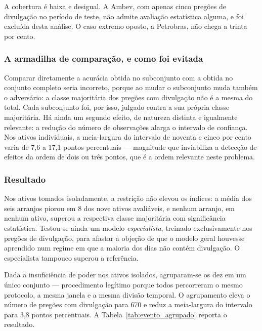 A cobertura é baixa e desigual. A Ambev, com apenas cinco pregões de divulgação no período de
teste, não admite avaliação estatística alguma, e foi excluída desta análise. O caso extremo
oposto, a Petrobras, não chega a trinta por cento.

\subsubsection{A armadilha de comparação, e como foi evitada}

Comparar diretamente a acurácia obtida no subconjunto com a obtida no conjunto completo seria
incorreto, porque ao mudar o subconjunto muda também o adversário: a classe majoritária dos
pregões com divulgação não é a mesma do total. Cada subconjunto foi, por isso, julgado contra a
sua própria classe majoritária. Há ainda um segundo efeito, de natureza distinta e igualmente
relevante: a redução do número de observações alarga o intervalo de confiança. Nos ativos
individuais, a meia-largura do intervalo de noventa e cinco por cento varia de 7{,}6 a 17{,}1
pontos percentuais --- magnitude que inviabiliza a detecção de efeitos da ordem de dois ou três
pontos, que é a ordem relevante neste problema.

\subsubsection{Resultado}

Nos ativos tomados isoladamente, a restrição não elevou os índices: a média dos seis arranjos
piorou em 8 dos nove ativos avaliáveis, e nenhum arranjo, em nenhum ativo, superou a
respectiva classe majoritária com significância estatística. Testou-se ainda um modelo
\emph{especialista}, treinado exclusivamente nos pregões de divulgação, para afastar a objeção de
que o modelo geral houvesse aprendido num regime em que a maioria dos dias não contém
divulgação. O especialista tampouco superou a referência.

Dada a insuficiência de poder nos ativos isolados, agruparam-se os dez em um único conjunto ---
procedimento legítimo porque todos percorreram o mesmo protocolo, a mesma janela e a mesma
divisão temporal. O agrupamento eleva o número de pregões com divulgação para 670 e reduz a
meia-largura do intervalo para 3{,}8 pontos percentuais. A Tabela~\ref{tab:evento_agrupado} reporta o
resultado.

